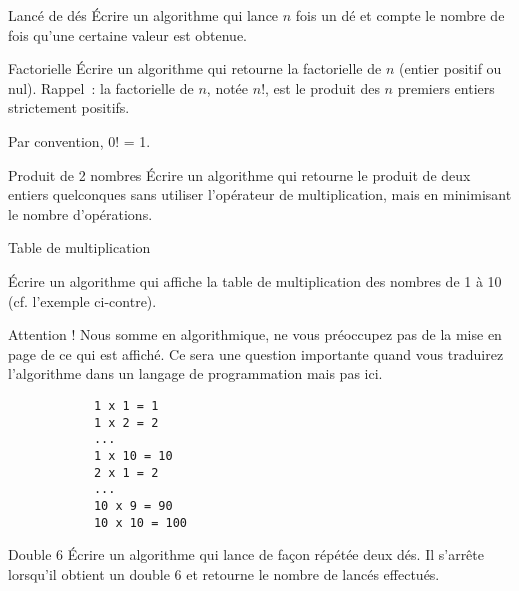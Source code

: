 	\begin{Exercice}{Lancé de dés}
		Écrire un algorithme qui lance $n$ fois un dé
		et compte le nombre de fois qu'une certaine valeur est obtenue.
		\begin{LDA}
		\end{LDA}
	\end{Exercice}
	
	\begin{Exercice}{Factorielle}
		Écrire un algorithme qui retourne la factorielle de $n$ (entier positif ou
		nul). Rappel~: la factorielle de $n$, notée $n$!, est le produit des $n$
		premiers entiers strictement positifs. 
		
		Par convention, 0! = 1.
	\end{Exercice}

	\begin{Exercice}{Produit de 2 nombres}
		Écrire un algorithme qui retourne le produit de deux entiers quelconques
		sans utiliser l’opérateur de multiplication, mais en minimisant le
		nombre d’opérations.
	\end{Exercice}

	\begin{Exercice}{Table de multiplication}

		\begin{minipage}[t]{10cm}
			Écrire un algorithme qui affiche la table de multiplication
			des nombres de 1 à 10
			(cf. l'exemple ci-contre).

			\medskip
			Attention ! Nous somme en algorithmique, 
			ne vous préoccupez pas de la mise en page de ce qui est affiché.
			Ce sera une question importante quand vous traduirez 
			l'algorithme dans un langage de programmation mais pas ici. 
		\end{minipage}
		\qquad
		\begin{minipage}[t]{4cm}
		\begin{verbatim}
			1 x 1 = 1
			1 x 2 = 2
			...
			1 x 10 = 10
			2 x 1 = 2
			...
			10 x 9 = 90
			10 x 10 = 100
		\end{verbatim}
		\end{minipage}		
	\end{Exercice}
	
	\begin{Exercice}{Double 6}
		Écrire un algorithme qui lance de façon répétée deux dés.
		Il s'arrête lorsqu'il obtient un double 6
		et retourne le nombre de lancés effectués.
	\end{Exercice}
	
